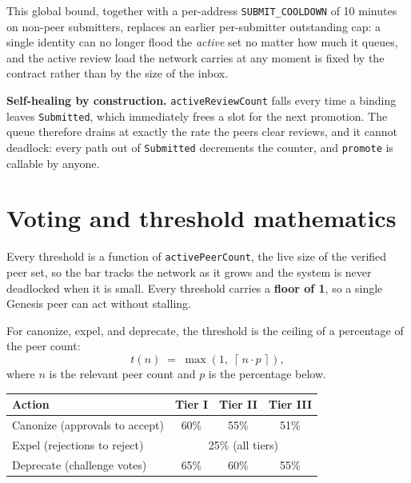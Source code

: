 \documentclass[11pt,a4paper]{article}
\newcommand{\ceilop}[1]{\ensuremath{\left\lceil #1 \right\rceil}}
\begin{document}
This global bound, together with a per-address \texttt{SUBMIT\_COOLDOWN} of
10 minutes on non-peer submitters, replaces an earlier per-submitter
outstanding cap: a single identity can no longer flood the \emph{active}
set no matter how much it queues, and the active review load the network
carries at any moment is fixed by the contract rather than by the size
of the inbox.

\begin{notebox}
\textbf{Self-healing by construction.} \texttt{activeReviewCount} falls every
time a binding leaves \texttt{Submitted}, which immediately frees a slot for
the next promotion. The queue therefore drains at exactly the rate the peers
clear reviews, and it cannot deadlock: every path out of \texttt{Submitted}
decrements the counter, and \texttt{promote} is callable by anyone.
\end{notebox}

\section{Voting and threshold mathematics}

Every threshold is a function of \texttt{activePeerCount}, the live size of
the verified peer set, so the bar tracks the network as it grows and the
system is never deadlocked when it is small. Every threshold carries a
\textbf{floor of 1}, so a single Genesis peer can act without stalling.

For canonize, expel, and deprecate, the threshold is the ceiling of a
percentage of the peer count:
\[
  t(n) \;=\; \max\!\left(1,\; \ceilop{\,n \cdot p\,}\right),
\]
where $n$ is the relevant peer count and $p$ is the percentage below.

\begin{center}
\begin{tabular}{@{}lccc@{}}
\toprule
\textbf{Action} & \textbf{Tier I} & \textbf{Tier II} & \textbf{Tier III} \\
\midrule
Canonize (approvals to accept)   & 60\% & 55\% & 51\% \\
Expel (rejections to reject)     & \multicolumn{3}{c}{25\% (all tiers)} \\
Deprecate (challenge votes)      & 65\% & 60\% & 55\% \\
\bottomrule
\end{tabular}
\end{center}
\end{document}
